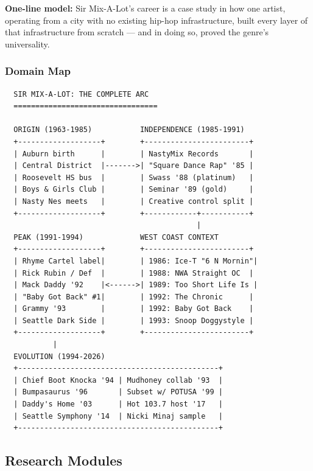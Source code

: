 \documentclass[11pt,letterpaper]{article}
\begin{document}
\begin{quotebox}
\textbf{One-line model:} Sir Mix-A-Lot's career is a case study in how one artist, operating from a city with no existing hip-hop infrastructure, built every layer of that infrastructure from scratch --- and in doing so, proved the genre's universality.
\end{quotebox}

\subsubsection{Domain Map}

\begin{asciibox}
\begin{verbatim}
  SIR MIX-A-LOT: THE COMPLETE ARC
  =================================

  ORIGIN (1963-1985)           INDEPENDENCE (1985-1991)
  +-------------------+        +------------------------+
  | Auburn birth      |        | NastyMix Records       |
  | Central District  |------->| "Square Dance Rap" '85 |
  | Roosevelt HS bus  |        | Swass '88 (platinum)   |
  | Boys & Girls Club |        | Seminar '89 (gold)     |
  | Nasty Nes meets   |        | Creative control split |
  +-------------------+        +------------+-----------+
                                            |
  PEAK (1991-1994)             WEST COAST CONTEXT
  +-------------------+        +------------------------+
  | Rhyme Cartel label|        | 1986: Ice-T "6 N Mornin"|
  | Rick Rubin / Def  |        | 1988: NWA Straight OC  |
  | Mack Daddy '92    |<------>| 1989: Too Short Life Is |
  | "Baby Got Back" #1|        | 1992: The Chronic      |
  | Grammy '93        |        | 1992: Baby Got Back    |
  | Seattle Dark Side |        | 1993: Snoop Doggystyle |
  +-------------------+        +------------------------+
           |
  EVOLUTION (1994-2026)
  +----------------------------------------------+
  | Chief Boot Knocka '94 | Mudhoney collab '93  |
  | Bumpasaurus '96       | Subset w/ POTUSA '99 |
  | Daddy's Home '03      | Hot 103.7 host '17   |
  | Seattle Symphony '14  | Nicki Minaj sample   |
  +----------------------------------------------+
\end{verbatim}
\end{asciibox}

\subsection{Research Modules}
\end{document}
